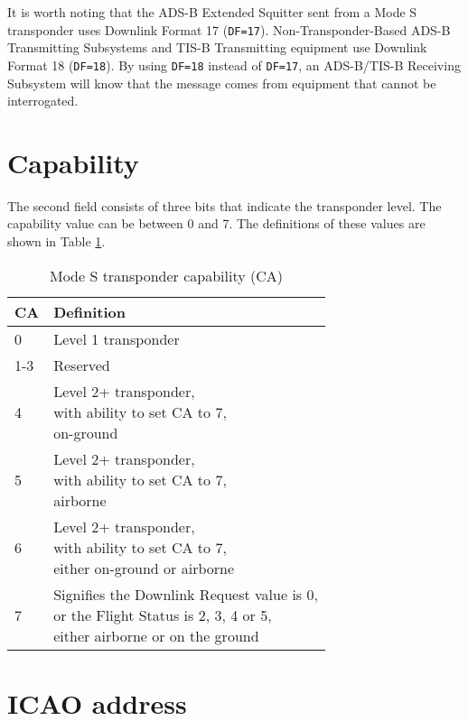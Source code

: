 It is worth noting that the ADS-B Extended Squitter sent from a Mode S transponder uses Downlink Format 17 (\texttt{DF=17}). Non-Transponder-Based ADS-B Transmitting Subsystems and TIS-B Transmitting equipment use Downlink Format 18 (\texttt{DF=18}). By using \texttt{DF=18} instead of \texttt{DF=17}, an ADS-B/TIS-B Receiving Subsystem will know that the message comes from equipment that cannot be interrogated.

\section{Capability}

The second field consists of three bits that indicate the transponder level. The capability value can be between 0 and 7. The definitions of these values are shown in Table \ref{tb:transponder_capability}.

\begin{table}[!ht]
\centering
\caption{Mode S transponder capability (CA)}
\label{tb:transponder_capability}
\begin{tabular}{|l|p{10cm}|}
\hline
\textbf{CA} & \textbf{Definition} \\ \hline
0 & Level 1 transponder \\ \hline
1-3 & Reserved \\ \hline
4 & \makecell*{Level 2+ transponder, \\ with ability to set CA to 7, \\ on-ground} \\ \hline
5 & \makecell*{Level 2+ transponder, \\ with ability to set CA to 7, \\ airborne} \\ \hline
6 & \makecell*{Level 2+ transponder, \\ with ability to set CA to 7, \\ either on-ground or airborne} \\ \hline
7 & \makecell*{Signifies the Downlink Request value is 0, \\ or the Flight Status is 2, 3, 4 or 5, \\ either airborne or on the ground} \\ \hline
\end{tabular}
\end{table}

\section{ICAO address}

